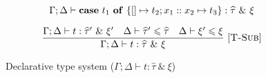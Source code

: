 \documentclass{llncs}
\renewcommand{\leq}{\leqslant}
\newcommand{\VER}{\\[1.5ex]}
\newcommand{\Rule}[3]{\frac{#2}{#3}\mbox{\ [\textsc{#1}]}}
\newcommand{\ExnTy}{\widehat\tau}
\newcommand{\Exn}{\xi}
\newcommand{\Tm}{t}
\newcommand{\TmVar}{x}
\newcommand{\TmCase}[5]{\mathbf{case}\ #1\ \mathbf{of}\ \{\left[\right]\mapsto #2; #3 :: #4 \mapsto #5\}}
\newcommand{\TyEnv}{\Gamma}
\newcommand{\KiEnv}{\Delta}
\newcommand{\JudgeExnTy}[5]{{#1; #2 \vdash #3 : #4\ \&\ #5}}
\newcommand{\JudgeSubTy}[3]{{#1 \vdash #2 \leq #3}}
\newcommand{\JudgeSubExn}[3]{{#1 \vdash #2 \leq #3}}
\begin{document}
\begin{figure*}[p]
\begin{gather*}
{             }
             {\JudgeExnTy{\TyEnv}
                         {\KiEnv}
                         {\TmCase{\Tm_1}{\Tm_2}{\TmVar_1}{\TmVar_2}{\Tm_3}}
                         {\ExnTy}
                         {\Exn}
             }
        \VER
        \Rule{T-Sub}
             {\JudgeExnTy{\TyEnv}
                         {\KiEnv}
                         {\Tm}
                         {\ExnTy^\prime}
                         {\Exn^\prime}
              \quad
              \JudgeSubTy{\KiEnv}
                         {\ExnTy^\prime}
                         {\ExnTy}
              \quad
              \JudgeSubExn{\KiEnv}
                          {\Exn^\prime}
                          {\Exn}
             }
             {\JudgeExnTy{\TyEnv}
                         {\KiEnv}
                         {\Tm}
                         {\ExnTy}
                         {\Exn}
             }
    \end{gather*}
    \caption{Declarative type system ($\JudgeExnTy{\TyEnv}{\KiEnv}{\Tm}{\ExnTy}{\Exn}$)}\label{figure-declarative-type-system}
\end{figure*}
\end{document}
